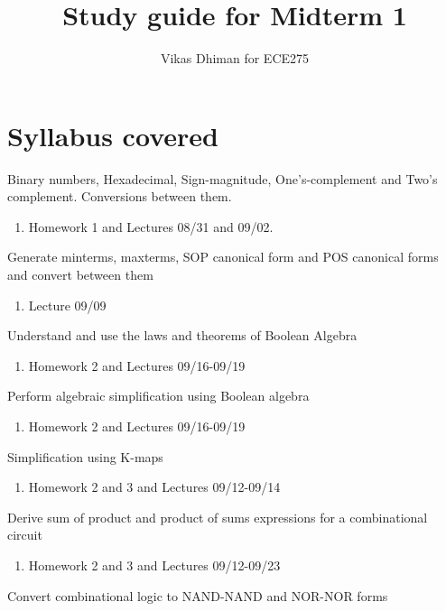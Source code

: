 \documentclass{article}
\title{Study guide for Midterm 1}
\author{Vikas Dhiman for ECE275}
\newcommand{\cmark}{\ding{51}}%
\newcommand{\done}{\rlap{$\square$}{\raisebox{2pt}{\large\hspace{1pt}\cmark}}%
  \hspace{-2.5pt}}
\begin{document}
\maketitle

\section{Syllabus covered}
\begin{todolist}
  \item[\done] Binary numbers, Hexadecimal, Sign-magnitude, One's-complement and
    Two's complement. Conversions between them.
    \begin{enumerate}
      \item Homework 1 and Lectures 08/31 and 09/02.
    \end{enumerate}
  \item[\done] Generate minterms, maxterms, SOP canonical form and POS
    canonical forms and convert between them\\
  \begin{enumerate}
    \item Lecture 09/09
  \end{enumerate}
  \item[\done]  Understand and use the laws and theorems of Boolean Algebra
  \begin{enumerate}
    \item Homework 2 and Lectures 09/16-09/19
  \end{enumerate}
  \item[\done]  Perform algebraic simplification using Boolean algebra
  \begin{enumerate}
    \item Homework 2 and Lectures 09/16-09/19
  \end{enumerate}
  \item[\done]  Simplification using K-maps
    \begin{enumerate}
    \item Homework 2 and 3 and Lectures 09/12-09/14
    \end{enumerate}
  \item[\done]  Derive sum of product and product of sums expressions for a combinational circuit
    \begin{enumerate}
    \item Homework 2 and 3 and Lectures 09/12-09/23
    \end{enumerate}
  \item[\done]  Convert combinational logic to NAND-NAND and NOR-NOR forms

\end{todolist}
\end{document}
